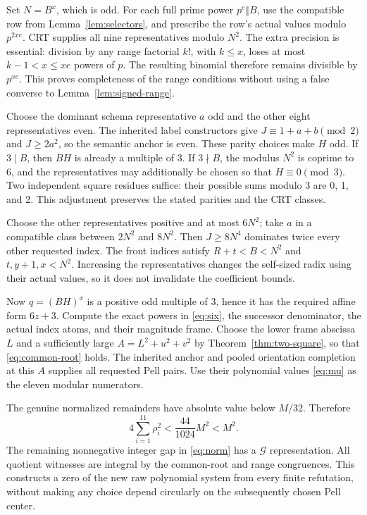 \documentclass[11pt]{article}
\theoremstyle{remark}\newtheorem{remark}[theorem]{Remark}
\newcommand{\G}{\mathcal G}\newcommand{\LL}{\mathcal L}
\begin{document}
Set $N=B^x$, which is odd. For each full prime power $p^e\Vert B$,
use the compatible row from Lemma~\ref{lem:selectors}, and prescribe
the row's actual values modulo $p^{2xe}$. CRT supplies all nine
representatives modulo $N^2$. The extra precision is essential:
division by any range factorial $k!$, with $k\le x$, loses at most
$k-1<x\le xe$ powers of $p$. The resulting binomial therefore
remains divisible by $p^{xe}$. This proves completeness of the range
conditions without using a false converse to Lemma~\ref{lem:signed-range}.

Choose the dominant schema representative $a$ odd and the other eight
representatives even. The inherited label constructors give
$J\equiv1+a+b\pmod2$ and $J\ge2a^2$, so the semantic anchor is
even. These parity choices make $H$ odd. If $3\mid B$, then $BH$
is already a multiple of 3. If $3\nmid B$, the modulus $N^2$ is
coprime to 6, and the representatives may additionally be chosen so
that $H\equiv0\pmod3$. Two independent square residues suffice:
their possible sums modulo 3 are 0, 1, and 2. This adjustment preserves
the stated parities and the CRT classes.

Choose the other representatives positive and at most $6N^2$; take
$a$ in a compatible class between $2N^2$ and $8N^2$. Then
$J\ge8N^4$ dominates twice every other requested index. The front
indices satisfy $R+t<B<N^2$ and $t,y+1,x<N^2$. Increasing the
representatives changes the self-sized radix using their actual values,
so it does not invalidate the coefficient bounds.

Now $q=(BH)^x$ is a positive odd multiple of 3, hence it has the
required affine form $6z+3$. Compute the exact powers in
\eqref{eq:six}, the successor denominator, the actual index atoms, and
their magnitude frame. Choose the lower frame abscissa $L$ and a sufficiently large
$A=L^2+u^2+v^2$ by Theorem~\ref{thm:two-square}, so that
\eqref{eq:common-root} holds. The inherited anchor and pooled
orientation completion at this $A$ supplies all requested Pell pairs.
Use their polynomial values \eqref{eq:mu} as the eleven modular
numerators.

The genuine normalized remainders have absolute value below $M/32$.
Therefore
\[
 4\sum_{i=1}^{11}\rho_i^2<\frac{44}{1024}M^2<M^2.
\]
The remaining nonnegative integer gap in \eqref{eq:norm} has a
$\G$ representation. All quotient witnesses are integral by the
common-root and range congruences. This constructs a zero of the
new raw polynomial system from every finite refutation, without
making any choice depend circularly on the subsequently chosen Pell
center.
\end{document}
